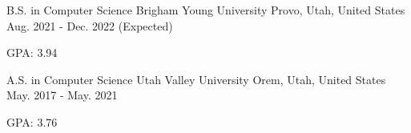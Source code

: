 

\begin{cventries}

  \cventry
    {B.S. in Computer Science} %
    {Brigham Young University} %
    {Provo, Utah, United States} %
    {Aug. 2021 - Dec. 2022 (Expected)} %
    {
      \begin{cvitems} %
        \item {GPA: 3.94}
      \end{cvitems}
    }
  
  \cventry
    {A.S. in Computer Science} %
    {Utah Valley University} %
    {Orem, Utah, United States} %
    {May. 2017 - May. 2021} %
    {
      \begin{cvitems} %
        \item {GPA: 3.76}
      \end{cvitems}
    }

\end{cventries}
